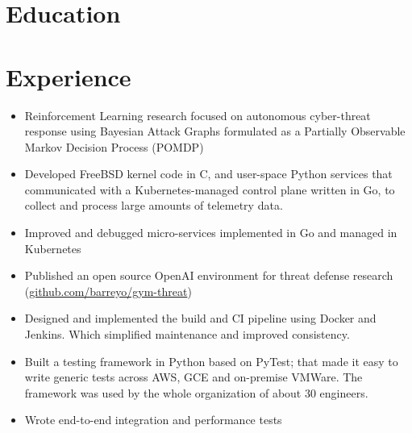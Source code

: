 \documentclass{cv_doc}
\begin{document}
\vspace{0.5cm}


\section*{Education}


\vspace{0.3cm}

\section*{Experience}


\begin{itemize}[label={\tiny\raisebox{1ex}{\textbullet}}]
  \item {Reinforcement Learning research focused on autonomous cyber-threat response using Bayesian Attack Graphs formulated as a Partially Observable
  Markov Decision Process (POMDP)}
  \item {Developed FreeBSD kernel code in C, and user-space Python services that
  communicated with a Kubernetes-managed control plane written in Go, to
  collect and process large amounts of telemetry data.}
  \item {Improved and debugged micro-services implemented in Go and managed in Kubernetes}
  \item {Published an open source OpenAI environment for
  threat defense research \\
  (\href{https://github.com/barreyo/gym-threat}{github.com/barreyo/gym-threat}})
\end{itemize}


\begin{itemize}[label={\tiny\raisebox{1ex}{\textbullet}}]
  \item {Designed and implemented the build and CI pipeline using Docker and Jenkins. Which simplified maintenance and improved consistency.}
  \item {Built a testing framework in Python based on PyTest; that made it easy
  to write generic tests across AWS, GCE and on-premise VMWare. The framework
  was used by the whole organization of about 30 engineers.}
  \item {Wrote end-to-end integration and performance tests}
\end{itemize}
\end{document}
